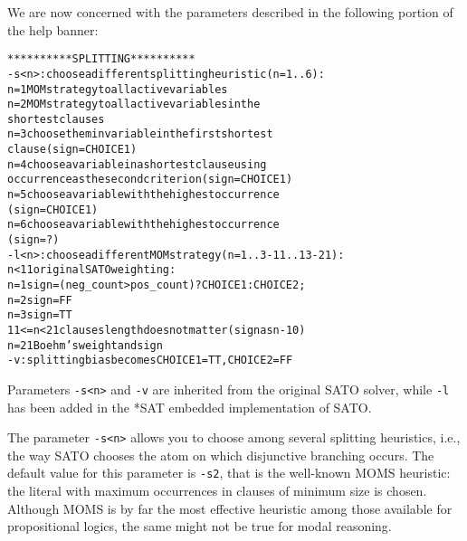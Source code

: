 \documentclass[12pt]{report}
\begin{document}
We are now concerned with the parameters described in the following
portion of the help banner:
\begin{alltt}
\scriptsize
********** SPLITTING **********
   -s<n>    : choose a different splitting heuristic (n = 1..6):
               n = 1 MOM strategy to all active variables
               n = 2 MOM strategy to all active variables in the
                     shortest clauses
               n = 3 choose the min variable in the first shortest
                      clause (sign = CHOICE1)
               n = 4 choose a variable in a shortest clause using
                     occurrence as the second criterion (sign = CHOICE1)
               n = 5 choose a variable with the highest occurrence
                     (sign = CHOICE1)
               n = 6 choose a variable with the highest occurrence
                     (sign = ?)
   -l<n>    : choose a different MOM strategy (n = 1..3 - 11..13 - 21):
               n < 11       original SATO weighting:
                   n=1 sign =(neg_count>pos_count)? CHOICE1 : CHOICE2;
                   n=2 sign = FF
                   n=3 sign = TT
               11 <= n < 21 clauses length does not matter (sign as n - 10)
               n = 21       Boehm's weight and sign
   -v       : splitting bias becomes CHOICE1 = TT, CHOICE2 = FF
\end{alltt}   
Parameters {\tt -s<n>} and {\tt -v} are inherited from the original SATO solver,
while {\tt -l} has been added in the *SAT embedded implementation of
SATO. 

The parameter {\tt -s<n>} allows you to choose among several splitting
heuristics, i.e., the way SATO chooses the atom on which disjunctive
branching occurs. The default value for this parameter is {\tt -s2},
that is the well-known MOMS heuristic: the literal with maximum
occurrences in clauses of minimum size is chosen. Although MOMS is by
far the most effective heuristic among those available for
propositional logics, the same might not be true for modal reasoning.  
\end{document}

